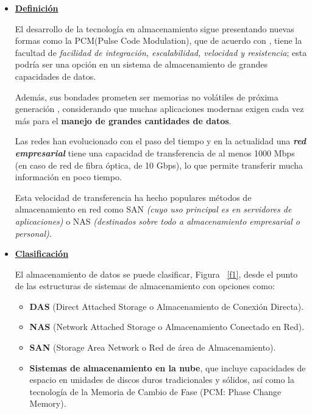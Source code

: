 \documentclass[10pt,journal]{IEEEtran}
\begin{document}
    \begin{itemize}
    \item \underline{\textbf{Definición}}
    
    El desarrollo de la tecnología en almacenamiento sigue presentando nuevas formas como la
    PCM(Pulse Code Modulation), que de acuerdo con \cite{criptogr4:online},
    tiene la facultad de \textit{facilidad de integración, escalabilidad, velocidad y resistencia}; esta podría ser una opción en un sistema de almacenamiento de grandes capacidades de datos.
    
    Además, sus bondades prometen ser memorias no volátiles de próxima generación \cite{yoon2013integrated}, considerando que muchas aplicaciones modernas exigen cada vez más para el \textbf{manejo de grandes cantidades de datos}. 
    
    Las redes han evolucionado con el paso del tiempo y en la actualidad una \textit{\textbf{red empresarial}} tiene una capacidad de transferencia de al menos 1000 Mbps (en caso de red de fibra óptica, de 10 Gbps), lo que permite transferir mucha información en poco tiempo.
    
    Esta velocidad de transferencia ha hecho populares métodos de almacenamiento en red como SAN \textit{(cuyo uso principal es en servidores de aplicaciones)} o NAS \textit{(destinados sobre todo a almacenamiento empresarial o personal)}.
    
    \item \underline{\textbf{Clasificación}}
    
    El almacenamiento de datos se puede clasificar, Figura ~\ref{f1}, desde el punto de las estructuras de sistemas de 
    almacenamiento con opciones como:
    
    \begin{itemize}
    \item \textbf{DAS} (Direct Attached Storage o Almacenamiento de Conexión Directa).
    \item \textbf{NAS} (Network Attached Storage o Almacenamiento Conectado en Red).
    \item \textbf{SAN} (Storage Area Network o Red de área de Almacenamiento).
    \item \textbf{Sistemas de almacenamiento en la nube}, que incluye capacidades de espacio en unidades de discos 
    duros tradicionales y sólidos, así como la tecnología de la Memoria de Cambio de Fase (PCM: Phase Change Memory).
    \end{itemize}
    

\end{itemize}
\end{document}
